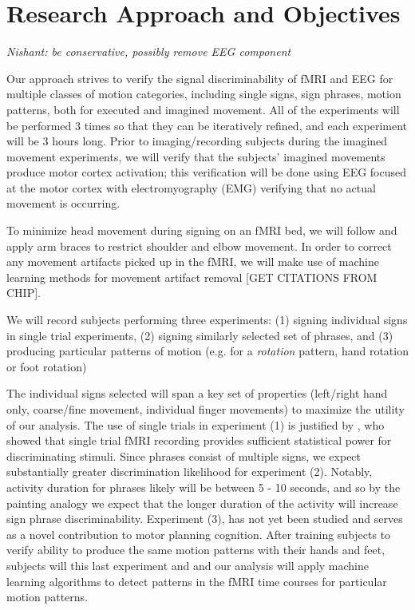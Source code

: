 \documentclass{proposal}
\begin{document}
\section{Research Approach and Objectives}
\textit{Nishant: be conservative, possibly remove EEG component}

Our approach strives to verify the signal discriminability of fMRI and EEG for multiple classes of motion categories, including single signs, sign phrases, motion patterns, both for executed and imagined movement. All of the experiments will be performed 3 times so that they can be iteratively refined, and each experiment will be 3 hours long. Prior to imaging/recording subjects during the imagined movement experiments, we will verify that the subjects' imagined movements produce motor cortex activation; this verification will be done using EEG focused at the motor cortex with electromyography (EMG) verifying that no actual movement is occurring.

To minimize head movement during signing on an fMRI bed, we will follow \cite{culham2003vgg} and apply arm braces to restrict shoulder and elbow movement. In order to correct any movement artifacts picked up in the fMRI, we will make use of machine learning methods for movement artifact removal [GET CITATIONS FROM CHIP].

We will record subjects performing three experiments: (1) signing individual signs in single trial experiments, (2) signing similarly selected set of phrases, and (3) producing particular patterns of motion (e.g. for a \textit{rotation} pattern, hand rotation or foot rotation)

The individual signs selected will span a key set of properties (left/right hand only, coarse/fine movement, individual finger movements) to maximize the utility of our analysis. The use of single trials in experiment (1) is justified by \cite{buckner1996dca}, who showed that single trial fMRI recording provides sufficient statistical power for discriminating stimuli. Since phrases consist of multiple signs, we expect substantially greater discrimination likelihood for experiment (2). Notably, activity duration for phrases likely will be between 5 - 10 seconds, and so by the painting analogy we expect that the longer duration of the activity will increase sign phrase discriminability. Experiment (3), has not yet been studied and serves as a novel contribution to motor planning cognition. After training subjects to verify ability to produce the same motion patterns with their hands and feet, subjects will this last experiment and and our analysis will apply machine learning algorithms to detect patterns in the fMRI time courses for particular motion patterns.
\end{document}
